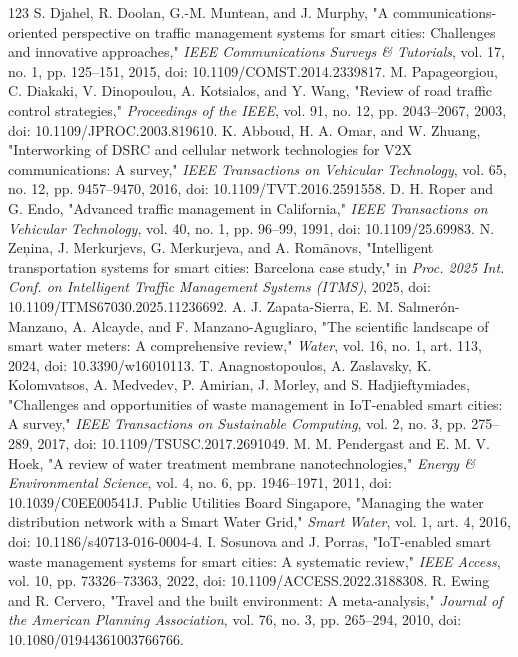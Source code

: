 \documentclass[journal]{IEEEtran}
\begin{document}
\begin{thebibliography}{123}
 S. Djahel, R. Doolan, G.-M. Muntean, and J. Murphy, "A communications-oriented perspective on traffic management systems for smart cities: Challenges and innovative approaches," \emph{IEEE Communications Surveys \& Tutorials}, vol. 17, no. 1, pp. 125--151, 2015, doi: 10.1109/COMST.2014.2339817.
 M. Papageorgiou, C. Diakaki, V. Dinopoulou, A. Kotsialos, and Y. Wang, "Review of road traffic control strategies," \emph{Proceedings of the IEEE}, vol. 91, no. 12, pp. 2043--2067, 2003, doi: 10.1109/JPROC.2003.819610.
 K. Abboud, H. A. Omar, and W. Zhuang, "Interworking of DSRC and cellular network technologies for V2X communications: A survey," \emph{IEEE Transactions on Vehicular Technology}, vol. 65, no. 12, pp. 9457--9470, 2016, doi: 10.1109/TVT.2016.2591558.
 D. H. Roper and G. Endo, "Advanced traffic management in California," \emph{IEEE Transactions on Vehicular Technology}, vol. 40, no. 1, pp. 96--99, 1991, doi: 10.1109/25.69983.
 N. Ze\c{n}ina, J. Merkurjevs, G. Merkurjeva, and A. Rom\={a}novs, "Intelligent transportation systems for smart cities: Barcelona case study," in \emph{Proc. 2025 Int. Conf. on Intelligent Traffic Management Systems (ITMS)}, 2025, doi: 10.1109/ITMS67030.2025.11236692.
 A. J. Zapata-Sierra, E. M. Salmer\'on-Manzano, A. Alcayde, and F. Manzano-Agugliaro, "The scientific landscape of smart water meters: A comprehensive review," \emph{Water}, vol. 16, no. 1, art. 113, 2024, doi: 10.3390/w16010113.
 T. Anagnostopoulos, A. Zaslavsky, K. Kolomvatsos, A. Medvedev, P. Amirian, J. Morley, and S. Hadjieftymiades, "Challenges and opportunities of waste management in IoT-enabled smart cities: A survey," \emph{IEEE Transactions on Sustainable Computing}, vol. 2, no. 3, pp. 275--289, 2017, doi: 10.1109/TSUSC.2017.2691049.
 M. M. Pendergast and E. M. V. Hoek, "A review of water treatment membrane nanotechnologies," \emph{Energy \& Environmental Science}, vol. 4, no. 6, pp. 1946--1971, 2011, doi: 10.1039/C0EE00541J.
 Public Utilities Board Singapore, "Managing the water distribution network with a Smart Water Grid," \emph{Smart Water}, vol. 1, art. 4, 2016, doi: 10.1186/s40713-016-0004-4.
 I. Sosunova and J. Porras, "IoT-enabled smart waste management systems for smart cities: A systematic review," \emph{IEEE Access}, vol. 10, pp. 73326--73363, 2022, doi: 10.1109/ACCESS.2022.3188308.
 R. Ewing and R. Cervero, "Travel and the built environment: A meta-analysis," \emph{Journal of the American Planning Association}, vol. 76, no. 3, pp. 265--294, 2010, doi: 10.1080/01944361003766766.

\end{thebibliography}
\end{document}
